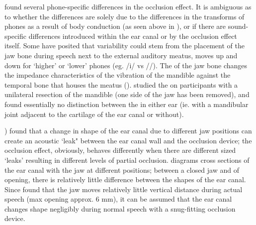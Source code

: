 \cite{hansen:97b} found several phone-specific differences in the occlusion effect\DIFdelbegin {}\DIFdelend . It is ambiguous as to whether the differences are solely due to the differences in the transforms of phones as a result of body conduction (as seen above in \cite{reinfeldt:10}), or if there are sound-specific differences introduced within the ear canal or by the occlusion effect itself.  
Some have posited that variability could \DIFdelbegin {}\DIFdelend stem from the placement of the jaw bone during speech next to the external auditory meatus, \DIFdelbegin {}\DIFdelend \DIFaddbegin {}\DIFaddend moves up and down for `higher' or `lower' phones (eg. /i/ vs /\DIFdelbegin {}\DIFdelend \DIFaddbegin {}\DIFaddend /). The \DIFdelbegin {}\DIFdelend \DIFaddbegin {}\DIFaddend of the jaw bone \DIFdelbegin {}\DIFdelend changes the impedance characteristics of the vibration of the mandible against the temporal bone that houses the meatus (\cite{bekesy:60}).  \cite{allen:60} studied the \DIFdelbegin {}\DIFdelend \DIFaddbegin {}\DIFaddend on participants with a unilateral resection of the mandible (one side of the jaw has been removed), and found essentially no distinction between the \DIFdelbegin {}\DIFdelend \DIFaddbegin {}\DIFaddend in either ear (ie. with a mandibular joint adjacent to the cartilage \DIFaddbegin {}\DIFaddend of the ear canal or without).

\DIFdelbegin {}\DIFdelend \cite{hansen:97b}) found that \DIFaddbegin {}\DIFaddend a change in shape of the ear canal due to different jaw positions can create an acoustic `leak" between the ear canal wall and the occlusion device; the occlusion effect, obviously, behaves differently when there are different sized `leaks' resulting in different levels of partial occlusion. 
\cite{hansen:97b} diagrams cross sections of the ear canal with the jaw at different positions; between a closed jaw and \DIFdelbegin \DIFdel{5mm }\DIFdelend \DIFaddbegin \DIFadd{5 mm }\DIFaddend of opening, there is relatively little difference between the shapes of the ear canal.  Since \cite{borghese:97} found that the jaw moves relatively little vertical distance during actual speech (max opening approx. 6 mm), it can be assumed that the ear canal changes shape negligibly during normal speech with a snug-fitting occlusion device. 

